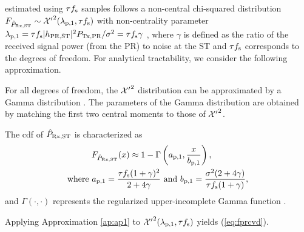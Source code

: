  estimated using $\tau f_{\text{s}}$ samples follows a non-central chi-squared distribution $\fprcvd \sim \ncchi2(\lpo, \tau \fsam)$ with non-centrality parameter $\lambda_{\text{p,1}} = \tau f_{\text{s}} |h_{\text{PR,ST}}|^2 P_{\text{Tx,PR}} /\sigma^2 = \tau f_{\text{s}} \gamma$ \cite{Kay}, where $\gamma$ is defined as the ratio of the received signal power (from the PR) to noise at the ST and $\tau f_{\text{s}}$ corresponds to the degrees of freedom. For analytical tractability, we consider the following approximation. 
\begin{approxi} \label{ap:ap1}
\normalfont
For all degrees of freedom, the $\ncchi2$ distribution can be approximated by a Gamma distribution \cite{abramo}. The parameters of the Gamma distribution are obtained by matching the first two central moments to those of $\ncchi2$.
\end{approxi}
\begin{lemma} \label{lm:lm1}
\normalfont
The cdf of $\hat{P}_{\text{Rx,ST}}$ is characterized as 
\begin{align}
\fprcvd(x) \approx 1 - \Gamma&\left(\apo, \frac{x}{\bpo}\right) \label{eq:fprcvd}, \\ 
\text{where  } \apo = \frac{\tau \fsam (1 + \gamma)^2}{2 + 4 \gamma} &\text{ and } \bpo = \frac{\nps (2 + 4 \gamma)}{\tau \fsam (1 + \gamma)},  \label{eq:para_po} 
\end{align} 
and $\Gamma(\cdot, \cdot)$ represents the regularized upper-incomplete Gamma function \cite{abramo}. 
\end{lemma}
\begin{IEEEproof}
Applying Approximation \ref{ap:ap1} to $\ncchi2(\lpo, \tau \fsam)$ yields (\ref{eq:fprcvd}). 
\end{IEEEproof}

